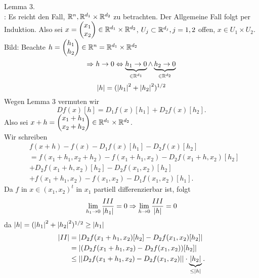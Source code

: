 \documentclass[../ana2.tex]{subfiles}
\begin{document}
\begin{bew}
    \gqq{\( \Rightarrow \)} Lemma 3.\\
    \gqq{\( \Leftarrow \)}: Es reicht den Fall, \( \mathbb{R}^n, \mathbb{R}^{d_1} \times \mathbb{R}^{d_2} \) 
    zu betrachten. Der Allgemeine Fall folgt per Induktion. 
    Also sei \( x = \begin{pmatrix} x_1 \\ x_2 \end{pmatrix} \in \mathbb{R}^{d_1} \times \mathbb{R}^{d_2} \), 
    \( U_j \subset \mathbb{R}^{d_j}, j = 1,2 \) offen, \( x \in U_1 \times U_2 \). 
    Bild: 
    Beachte \(h = \begin{pmatrix}
        h_1 \\
        h_2
    \end{pmatrix} \in \mathbb{R}^n = \mathbb{R}^{d_1} \times \mathbb{R}^{d_2} \)
    \[ \Rightarrow h \rightarrow 0 \Leftrightarrow 
    \underbrace{h_1 \rightarrow 0}_{\in \mathbb{R}^{d_1}}
    \wedge \underbrace{h_2 \rightarrow 0}_{\in \mathbb{R}^{d_2}} \]
    \[ \left|h\right| = (\left|h_1\right|^2 + \left|h_2\right|^2)^{1/2} \]
    Wegen Lemma 3 vermuten wir 
    \[ Df(x)[h] = D_1f(x)[h_1] + D_2f(x)[h_2]. \]
    Also sei \( x + h = 
    \begin{pmatrix} x_1 + h_1 \\ x_2 + h_2 \end{pmatrix} 
    \in \mathbb{R}^{d_1} \times \mathbb{R}^{d_2} \).\\
    Wir schreiben 
    \begin{align*}
        &f(x + h) - f(x) - D_1f(x)[h_1] - D_2 f(x)[h_2] \\
        &= f(x_1 + h_1, x_2 + h_2) - f(x_1 + h_1, x_2) 
        - D_2 f(x_1 + h, x_2)[h_2] \tag{I}\\ 
        &+ D_2 f(x_1 + h, x_2)[h_2] - D_2 f(x_1, x_2)[h_2] \tag{II} \\
        &+ f(x_1 + h_1, x_2) - f(x_1, x_2) - D_1 f(x_1, x_2)[h_1] \tag{III}.
    \end{align*}
    Da \(f\) in \(x \in (x_1, x_2)^t\) in \(x_1\) partiell 
    differenzierbar ist, folgt 
    \[ \lim\limits_{h_1\rightarrow{}0} \frac{III}{\left|h_1\right|} = 0 \Rightarrow
    \lim\limits_{h\rightarrow{}0} \frac{III}{\left|h\right|} = 0 \]
    da \( \left|h\right| = (\left|h_1\right|^2 + \left|h_2\right|^2)^{1/2} \geq \left|h_1\right| \)
    \begin{align*}
        \abs{II} &= \abs{ D_2 f(x_1 + h_1, x_2)[h_2] - D_2 f(x_1, x_2)[h_2] } \\
        &= \abs{ (D_2 f(x_1 + h_1, x_2) - D_2 f(x_1, x_2))[h_2] }\\
        &\leq \norm{ D_2 f(x_1 + h_1, x_2) - D_2 f(x_1, x_2) } \cdot \underbrace{\abs{h_2}}_{\leq \abs{h}}.

\end{align*}
\end{bew}
\end{document}
